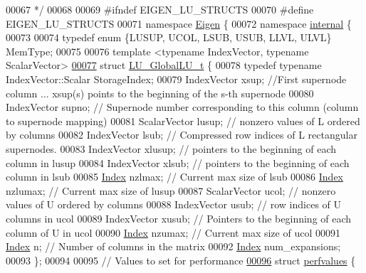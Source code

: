 \begin{DoxyCode}
00067 \textcolor{comment}{ */}
00068 
00069 \textcolor{preprocessor}{#ifndef EIGEN\_LU\_STRUCTS}
00070 \textcolor{preprocessor}{#define EIGEN\_LU\_STRUCTS}
00071 \textcolor{keyword}{namespace }\hyperlink{namespace_eigen}{Eigen} \{
00072 \textcolor{keyword}{namespace }\hyperlink{namespaceinternal}{internal} \{
00073   
00074 \textcolor{keyword}{typedef} \textcolor{keyword}{enum} \{LUSUP, UCOL, LSUB, USUB, LLVL, ULVL\} MemType; 
00075 
00076 \textcolor{keyword}{template} <\textcolor{keyword}{typename} IndexVector, \textcolor{keyword}{typename} ScalarVector>
\hyperlink{struct_eigen_1_1internal_1_1_l_u___global_l_u__t}{00077} \textcolor{keyword}{struct }\hyperlink{struct_eigen_1_1internal_1_1_l_u___global_l_u__t}{LU\_GlobalLU\_t} \{
00078   \textcolor{keyword}{typedef} \textcolor{keyword}{typename} IndexVector::Scalar StorageIndex; 
00079   IndexVector xsup; \textcolor{comment}{//First supernode column ... xsup(s) points to the beginning of the s-th supernode}
00080   IndexVector supno; \textcolor{comment}{// Supernode number corresponding to this column (column to supernode mapping)}
00081   ScalarVector  lusup; \textcolor{comment}{// nonzero values of L ordered by columns }
00082   IndexVector lsub; \textcolor{comment}{// Compressed row indices of L rectangular supernodes. }
00083   IndexVector xlusup; \textcolor{comment}{// pointers to the beginning of each column in lusup}
00084   IndexVector xlsub; \textcolor{comment}{// pointers to the beginning of each column in lsub}
00085   \hyperlink{namespace_eigen_a62e77e0933482dafde8fe197d9a2cfde}{Index}   nzlmax; \textcolor{comment}{// Current max size of lsub}
00086   \hyperlink{namespace_eigen_a62e77e0933482dafde8fe197d9a2cfde}{Index}   nzlumax; \textcolor{comment}{// Current max size of lusup}
00087   ScalarVector  ucol; \textcolor{comment}{// nonzero values of U ordered by columns }
00088   IndexVector usub; \textcolor{comment}{// row indices of U columns in ucol}
00089   IndexVector xusub; \textcolor{comment}{// Pointers to the beginning of each column of U in ucol }
00090   \hyperlink{namespace_eigen_a62e77e0933482dafde8fe197d9a2cfde}{Index}   nzumax; \textcolor{comment}{// Current max size of ucol}
00091   \hyperlink{namespace_eigen_a62e77e0933482dafde8fe197d9a2cfde}{Index}   n; \textcolor{comment}{// Number of columns in the matrix  }
00092   \hyperlink{namespace_eigen_a62e77e0933482dafde8fe197d9a2cfde}{Index}   num\_expansions; 
00093 \};
00094 
00095 \textcolor{comment}{// Values to set for performance}
\hyperlink{struct_eigen_1_1internal_1_1perfvalues}{00096} \textcolor{keyword}{struct }\hyperlink{struct_eigen_1_1internal_1_1perfvalues}{perfvalues} \{

\end{DoxyCode}
